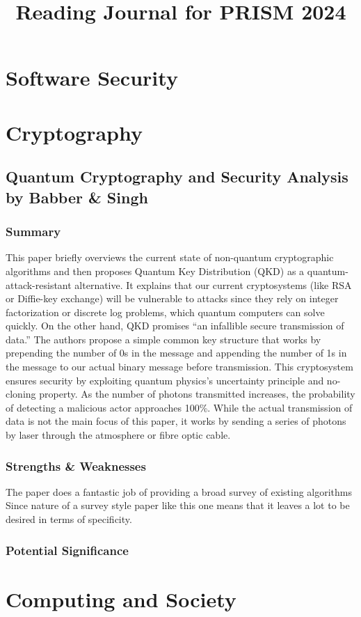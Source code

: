 \documentclass{article}
\begin{document}

\title{Reading Journal for PRISM 2024}
\author{}
\date{}
\maketitle

\section{Software Security}

\section{Cryptography}
\subsection*{Quantum Cryptography and Security Analysis by Babber \& Singh}

\subsubsection*{Summary}
This paper briefly overviews the current state of non-quantum cryptographic algorithms and then proposes Quantum Key Distribution (QKD) 
as a quantum-attack-resistant alternative. It explains that our current cryptosystems (like RSA or Diffie-key exchange) will be vulnerable 
to attacks since they rely on integer factorization or discrete log problems, which quantum computers can solve quickly. On the other hand, 
QKD promises “an infallible secure transmission of data.” The authors propose a simple common key structure that works by prepending the number 
of 0s in the message and appending the number of 1s in the message to our actual binary message before transmission. This cryptosystem ensures 
security by exploiting quantum physics's uncertainty principle and no-cloning property. As the number of photons transmitted increases, the 
probability of detecting a malicious actor approaches 100\%. While the actual transmission of data is not the main focus of this paper, it 
works by sending a series of photons by laser through the atmosphere or fibre optic cable. 

\subsubsection*{Strengths \& Weaknesses}
The paper does a fantastic job of providing a broad survey of existing algorithms 
Since nature of a survey style paper like this one means that it leaves a lot to be desired in terms of specificity. 

\subsubsection*{Potential Significance}

\section{Computing and Society}

\end{document}
